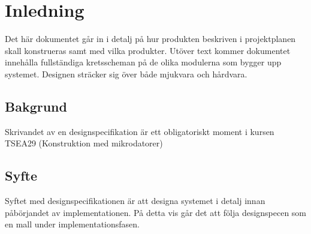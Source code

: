 \documentclass[designspec/spec.tex]{subfiles}
\begin{document}
\section{Inledning}
Det här dokumentet går in i detalj på hur produkten beskriven i projektplanen
skall konstrueras samt med vilka produkter. Utöver text kommer dokumentet
innehålla fullständiga kretsscheman på de olika modulerna som bygger upp
systemet. Designen sträcker sig över både mjukvara och hårdvara.

\subsection{Bakgrund}
Skrivandet av en designspecifikation är ett obligatoriskt moment i kursen
TSEA29 (Konstruktion med mikrodatorer)

\subsection{Syfte}
Syftet med designspecifikationen är att designa systemet i detalj innan
påbörjandet av implementationen. På detta vis går det att följa designspecen
som en mall under implementationsfasen.
\end{document}
